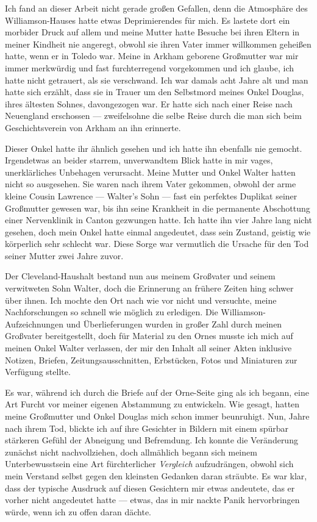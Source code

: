 Ich fand an dieser Arbeit nicht gerade großen Gefallen, denn die Atmosphäre des Williamson-Hauses hatte etwas Deprimierendes für mich. Es lastete dort ein morbider Druck auf allem und meine Mutter hatte Besuche bei ihren Eltern in meiner Kindheit nie angeregt, obwohl sie ihren Vater immer willkommen geheißen hatte, wenn er in Toledo war. Meine in Arkham geborene Großmutter war mir immer merkwürdig und fast furchterregend vorgekommen und ich glaube, ich hatte nicht getrauert, als sie verschwand. Ich war damals acht Jahre alt und man hatte sich erzählt, dass sie in Trauer um den Selbstmord meines Onkel Douglas, ihres ältesten Sohnes, davongezogen war. Er hatte sich nach einer Reise nach Neuengland erschossen --- zweifelsohne die selbe Reise durch die man sich beim Geschichtsverein von Arkham an ihn erinnerte.

Dieser Onkel hatte ihr ähnlich gesehen und ich hatte ihn ebenfalls nie gemocht. Irgendetwas an beider starrem, unverwandtem Blick hatte in mir vages, unerklärliches Unbehagen verursacht. Meine Mutter und Onkel Walter hatten nicht so ausgesehen. Sie waren nach ihrem Vater  gekommen, obwohl der arme kleine Cousin Lawrence --- Walter's Sohn --- fast ein perfektes Duplikat seiner Großmutter gewesen war, bis ihn seine Krankheit in die permanente Abschottung einer Nervenklinik in Canton gezwungen hatte. Ich hatte ihn vier Jahre lang nicht gesehen, doch mein Onkel hatte einmal angedeutet, dass sein Zustand, geistig wie körperlich sehr schlecht war. Diese Sorge war vermutlich die Ursache für den Tod seiner Mutter zwei Jahre zuvor.

Der Cleveland-Haushalt bestand nun aus meinem Großvater und seinem verwitweten Sohn Walter, doch die Erinnerung an frühere Zeiten hing schwer über ihnen. Ich mochte den Ort nach wie vor nicht und versuchte, meine Nachforschungen so schnell wie möglich zu erledigen. Die Williamson-\-Aufzeichnungen und Überlieferungen wurden in großer Zahl durch meinen Großvater bereitgestellt, doch für Material zu den Ornes musste ich mich auf meinen Onkel Walter verlassen, der mir den Inhalt all seiner Akten inklusive Notizen, Briefen, Zeitungsausschnitten, Erbstücken, Fotos und Miniaturen zur Verfügung stellte.

Es war, während ich durch die Briefe auf der Orne-Seite ging als ich begann, eine Art Furcht vor meiner eigenen Abstammung zu entwickeln. Wie gesagt, hatten meine Großmutter und Onkel Douglas mich schon immer beunruhigt. Nun, Jahre nach ihrem Tod, blickte ich auf ihre Gesichter in Bildern mit einem spürbar stärkeren Gefühl der Abneigung und Befremdung. Ich konnte die Veränderung zunächst nicht nachvollziehen, doch allmählich begann sich meinem  Unterbewusstsein eine Art fürchterlicher \textit{Vergleich}  aufzudrängen, obwohl sich mein Verstand selbst gegen den kleinsten Gedanken daran sträubte. Es war klar, dass der typische Ausdruck auf diesen Gesichtern mir etwas andeutete, das er vorher nicht angedeutet hatte --- etwas, das in mir nackte Panik hervorbringen würde, wenn ich zu offen daran dächte.

